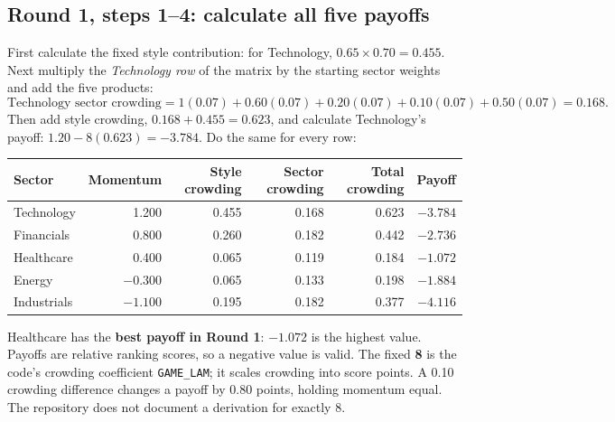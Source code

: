 \documentclass[11pt,letterpaper]{article}
\newcommand{\topic}[1]{\Needspace{5\baselineskip}\subsection*{#1}}
\newcommand{\word}[1]{\text{#1}}
\begin{document}
\topic{Round 1, steps 1--4: calculate all five payoffs}
First calculate the fixed style contribution: for Technology, $0.65\times0.70=0.455$. Next multiply the \emph{Technology row} of the matrix by the starting sector weights and add the five products:
\[
\word{Technology sector crowding}=1(0.07)+0.60(0.07)+0.20(0.07)+0.10(0.07)+0.50(0.07)=0.168.
\]
Then add style crowding, $0.168+0.455=0.623$, and calculate Technology's payoff: $1.20-8(0.623)=-3.784$. Do the same for every row:
\begin{center}
\small
\begin{tabular}{@{}lrrrrr@{}}
\toprule
Sector & Momentum & Style crowding & Sector crowding & Total crowding & Payoff\\
\midrule
Technology & 1.200 & 0.455 & 0.168 & 0.623 & $-3.784$\\
Financials & 0.800 & 0.260 & 0.182 & 0.442 & $-2.736$\\
Healthcare & 0.400 & 0.065 & 0.119 & 0.184 & $-1.072$\\
Energy & $-0.300$ & 0.065 & 0.133 & 0.198 & $-1.884$\\
Industrials & $-1.100$ & 0.195 & 0.182 & 0.377 & $-4.116$\\
\bottomrule
\end{tabular}
\end{center}
Healthcare has the \textbf{best payoff in Round 1}: $-1.072$ is the highest value. Payoffs are relative ranking scores, so a negative value is valid. The fixed \textbf{8} is the code's crowding coefficient \texttt{GAME\_LAM}; it scales crowding into score points. A 0.10 crowding difference changes a payoff by 0.80 points, holding momentum equal. The repository does not document a derivation for exactly 8.
\end{document}
